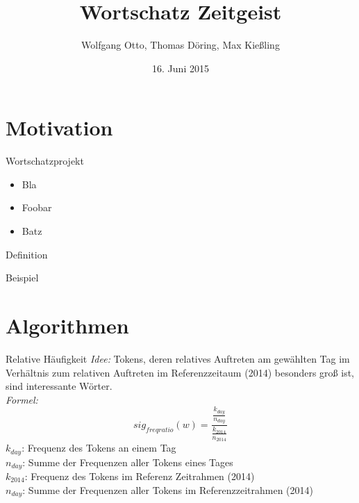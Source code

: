 \documentclass{beamer}
\author[Otto, Döring, Kiessling]{Wolfgang Otto, Thomas Döring, Max Kießling}
\title{Wortschatz Zeitgeist}
\institute{Seminar Anwendungen der linguistischen Informatik}
\date{16. Juni 2015}
\begin{document}
	
\watermarkoff

\begin{frame}[t,plain]
	\titlepage
\end{frame}

\begin{frame}[t,plain]
	\tableofcontents
\end{frame}


\section{Motivation}
\begin{frame} \sectionpage \end{frame}


\begin{frame}{Wortschatzprojekt}
 \begin{itemize}
 	\item Bla
 	\item Foobar
 	\item Batz
 \end{itemize}
 
 \begin{definition}
 	Definition
 \end{definition}
 
 \begin{example}
 	Beispiel
 \end{example}
\end{frame}


\section{Algorithmen}
\begin{frame} \sectionpage \end{frame}

\begin{frame}{Relative Häufigkeit}
	\emph{Idee: } Tokens, deren relatives Auftreten am gewählten Tag im Verhältnis zum relativen Auftreten im Referenzzeitaum (2014) besonders groß ist, sind interessante Wörter.\\ 
	\emph{Formel: } 
	\begin{equation}
	sig_{freqratio}(w) = \frac{\frac{k_{day}}{n_{day}}}{\frac{k_{2014}}{n_{2014}}}
	\end{equation}
	$k_{day}$: Frequenz des Tokens an einem Tag\\
	$n_{day}$: Summe der Frequenzen aller Tokens eines Tages\\
	$k_{2014}$: Frequenz des Tokens im Referenz Zeitrahmen (2014)\\
	$n_{day}$: Summe der Frequenzen aller Tokens im Referenzzeitrahmen (2014)\\
\end{frame}
\end{document}
